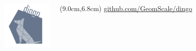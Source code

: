 \documentclass{beamer}
\begin{document}
\begin{frame}
\begin{columns}[onlytextwidth]

            \includegraphics[width=25mm]{../met_nets/resources/dingo5_transparent.png}
            \begin{textblock*}{3cm}(9.0cm,6.8cm)
               \tiny	 \href{https://github.com/GeomScale/dingo}{github.com/GeomScale/dingo}
            \end{textblock*}

      \end{columns}
   \end{frame}
\end{document}
